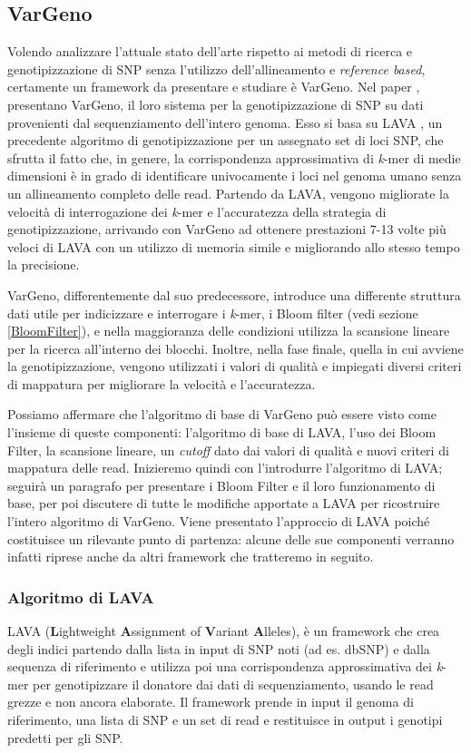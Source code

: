 \documentclass[../main.tex]{subfiles}
\begin{document}
\subsection{VarGeno}
\label{vargeno}
Volendo analizzare l'attuale stato dell'arte rispetto ai metodi di ricerca e genotipizzazione di SNP senza l'utilizzo dell'allineamento e \textit{reference based}, certamente un framework da presentare e studiare è VarGeno. Nel paper \cite{sun-medvedev2018vargeno}, presentano VarGeno, il loro sistema per la genotipizzazione di SNP su dati provenienti dal sequenziamento dell'intero genoma. Esso si basa su LAVA \cite{shajii2016lava}, un precedente algoritmo di genotipizzazione per un assegnato set di loci SNP, che sfrutta il fatto che, in genere, la corrispondenza approssimativa di \textit{k}-mer di medie dimensioni è in grado di identificare univocamente i loci nel genoma umano senza un allineamento completo delle read. Partendo da LAVA, vengono migliorate la velocità di interrogazione dei \textit{k}-mer e l'accuratezza della strategia di genotipizzazione, arrivando con VarGeno ad ottenere prestazioni 7-13 volte più veloci di LAVA con un utilizzo di memoria simile e migliorando allo stesso tempo la precisione.

VarGeno, differentemente dal suo predecessore, introduce una differente struttura dati utile per indicizzare e interrogare i \textit{k}-mer, i Bloom filter (vedi sezione \ref{BloomFilter}), e nella maggioranza delle condizioni utilizza la scansione lineare per la ricerca all'interno dei blocchi. Inoltre, nella fase finale, quella in cui avviene la genotipizzazione, vengono utilizzati i valori di qualità e impiegati diversi criteri di mappatura per migliorare la velocità e l'accuratezza. 

Possiamo affermare che l'algoritmo di base di VarGeno può essere visto come l'insieme di queste componenti: l'algoritmo di base di LAVA, l'uso dei Bloom Filter, la scansione lineare, un \textit{cutoff} dato dai valori di qualità e nuovi criteri di mappatura delle read. Inizieremo quindi con l'introdurre l'algoritmo di LAVA; seguirà un paragrafo per presentare i Bloom Filter e il loro funzionamento di base, per poi discutere di tutte le modifiche apportate a LAVA per ricostruire l'intero algoritmo di VarGeno. Viene presentato l'approccio di LAVA poiché costituisce un rilevante punto di partenza: alcune delle sue componenti verranno infatti riprese anche da altri framework che tratteremo in seguito.

\subsubsection{Algoritmo di LAVA}
\label{lava}
LAVA (\textbf{L}ightweight \textbf{A}ssignment of \textbf{V}ariant \textbf{A}lleles), è un framework che crea degli indici partendo dalla lista in input di SNP noti (ad es. dbSNP) e dalla sequenza di riferimento e utilizza poi una corrispondenza approssimativa dei \textit{k}-mer per genotipizzare il donatore dai dati di sequenziamento, usando le read grezze e non ancora elaborate. Il framework prende in input il genoma di riferimento, una lista di SNP e un set di read e restituisce in output i genotipi predetti per gli SNP. 
\end{document}
